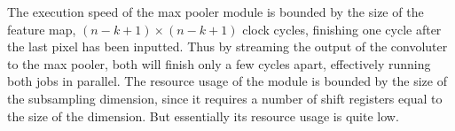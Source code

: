 The execution speed of the max pooler module is bounded by the size of the feature map, $ (n-k+1) \times (n-k+1) $ clock cycles, finishing one cycle after the last pixel has been inputted. 
Thus by streaming the output of the convoluter to the max pooler, both will finish only a few cycles apart, effectively running both jobs in parallel. The resource usage of the module is bounded by the size of the subsampling dimension, since it requires a number of shift registers equal to the size of the dimension. But essentially its resource usage is quite low.  
